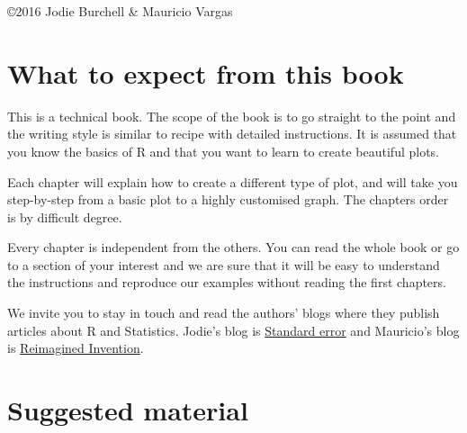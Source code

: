 \documentclass[10pt, oneside]{report}
\begin{document}
\copyright 2016 Jodie Burchell \& Mauricio Vargas

\newpage
\tableofcontents
\newpage

%
%


\setcounter{page}{1}

\chapter*{What to expect from this book}

This is a technical book. The scope of the book is to go straight to the point and the writing style is similar to recipe with detailed instructions. It is assumed that you know the basics of R and that you want to learn to create beautiful plots. 

Each chapter will explain how to create a different type of plot, and will take you step-by-step from a basic plot to a highly customised graph. The chapters order is by difficult degree.

Every chapter is independent from the others. You can read the whole book or go to a section of your interest and we are sure that it will be easy to understand the instructions and reproduce our examples without reading the first chapters.

We invite you to stay in touch and read the authors' blogs where they publish articles about R and Statistics. Jodie's blog is \href{http://t-redactyl.io/}{Standard error} and Mauricio's blog is \href{http://pachamaltese.github.io/}{Reimagined Invention}.













\chapter*{Suggested material}
%
\end{document}
